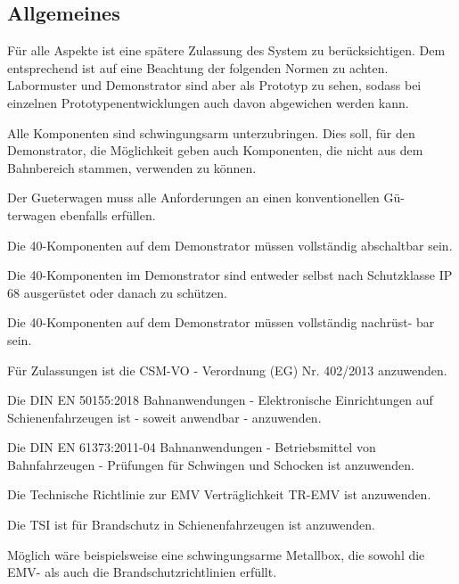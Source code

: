 \subsection{Allgemeines}
Für alle Aspekte ist eine spätere Zulassung des System zu berücksichtigen. Dem entsprechend ist auf eine Beachtung der folgenden Normen zu achten. Labormuster und \gls{Demonstrator} sind aber als Prototyp zu sehen, sodass bei einzelnen Prototypenentwicklungen auch davon abgewichen werden kann. \par
Alle Komponenten sind schwingungsarm unterzubringen. Dies soll, für den Demonstrator, die Möglichkeit geben auch Komponenten, die nicht aus dem Bahnbereich stammen, verwenden zu können.
\begin{feat}
Der \gls{Gueterwagen} muss alle Anforderungen an einen konventionellen Gü- terwagen ebenfalls erfüllen.
\end{feat}
\begin{feat}
Die \gls{40-Komponenten} auf dem \gls{Demonstrator} müssen vollständig abschaltbar sein.
\end{feat}
\begin{feat}
Die \gls{40-Komponenten} im \gls{Demonstrator} sind entweder selbst nach Schutzklasse IP 68 ausgerüstet oder danach zu schützen.
\end{feat}
\begin{feat}
Die \gls{40-Komponenten} auf dem \gls{Demonstrator} müssen vollständig nachrüst- bar sein.
\end{feat}
\begin{feat}
Für Zulassungen ist die CSM-VO - Verordnung (EG) Nr. 402/2013 anzuwenden.
\end{feat}
\begin{feat}
Die \acrshort{DIN} \acrshort{EN} 50155:2018 Bahnanwendungen - Elektronische Einrichtungen auf Schienenfahrzeugen ist - soweit anwendbar - anzuwenden.
\end{feat}
\begin{feat}
Die \acrshort{DIN} \acrshort{EN} 61373:2011-04 Bahnanwendungen - Betriebsmittel von Bahnfahrzeugen - Prüfungen für Schwingen und Schocken ist anzuwenden.
\end{feat}
\begin{feat}
Die Technische Richtlinie zur EMV Verträglichkeit TR-EMV ist anzuwenden.
\end{feat}
\begin{feat}
Die TSI ist für Brandschutz in Schienenfahrzeugen ist anzuwenden.
\end{feat}
\begin{rem}[zu Anf. 6-8]
Möglich wäre beispielsweise eine schwingungsarme Metallbox, die sowohl die EMV- als auch die Brandschutzrichtlinien erfüllt.
\end{rem}

